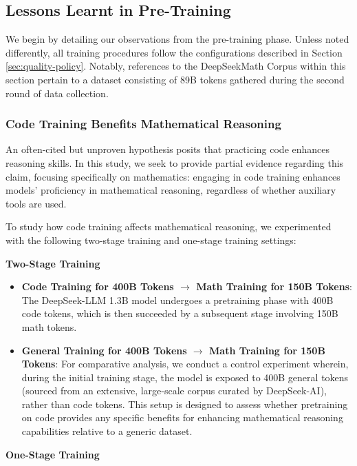 \begin{itemize}[topsep=0pt]
\begin{itemize}[topsep=0pt]
\subsection{Lessons Learnt in Pre-Training}

We begin by detailing our observations from the pre-training phase. Unless noted differently, all training procedures follow the configurations described in Section \ref{sec:quality-policy}. Notably, references to the DeepSeekMath Corpus within this section pertain to a dataset consisting of 89B tokens gathered during the second round of data collection.

\subsubsection{Code Training Benefits Mathematical Reasoning}

An often-cited but unproven hypothesis posits that practicing code enhances reasoning skills. In this study, we seek to provide partial evidence regarding this claim, focusing specifically on mathematics: engaging in code training enhances models’ proficiency in mathematical reasoning, regardless of whether auxiliary tools are used.

To study how code training affects mathematical reasoning, we experimented with the following two-stage training and one-stage training settings:

\textbf{Two-Stage Training}

\begin{itemize}[topsep=0pt]
    \item \textbf{Code Training for 400B Tokens $\rightarrow$ Math Training for 150B Tokens}: The DeepSeek-LLM 1.3B model undergoes a pretraining phase with 400B code tokens, which is then succeeded by a subsequent stage involving 150B math tokens.
    \item \textbf{General Training for 400B Tokens $\rightarrow$ Math Training for 150B Tokens}: For comparative analysis, we conduct a control experiment wherein, during the initial training stage, the model is exposed to 400B general tokens (sourced from an extensive, large-scale corpus curated by DeepSeek-AI), rather than code tokens. This setup is designed to assess whether pretraining on code provides any specific benefits for enhancing mathematical reasoning capabilities relative to a generic dataset.
\end{itemize}

\textbf{One-Stage Training}


\end{itemize}
\end{itemize}
